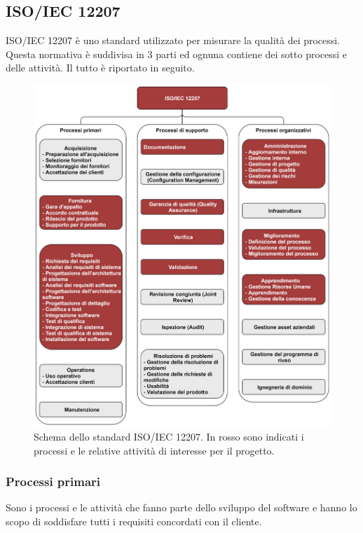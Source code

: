 \subsection{ISO/IEC 12207}
ISO/IEC 12207 è uno standard utilizzato per misurare la qualità dei processi. Questa normativa è suddivisa in 3 parti
ed ognuna contiene dei sotto processi e delle attività. Il tutto è riportato in seguito. 

\begin{figure}[h]
    \centering
    \includegraphics[scale=0.53]{sezioni/Immagini/IsoIec12207.png}
    \caption{Schema dello standard ISO/IEC 12207. In rosso sono indicati i processi e le relative attività di interesse per il progetto.}
\end{figure}

\subsubsection{Processi primari}
Sono i processi e le attività che fanno parte dello sviluppo del software e hanno lo scopo di soddisfare tutti i requisiti concordati con il cliente.

